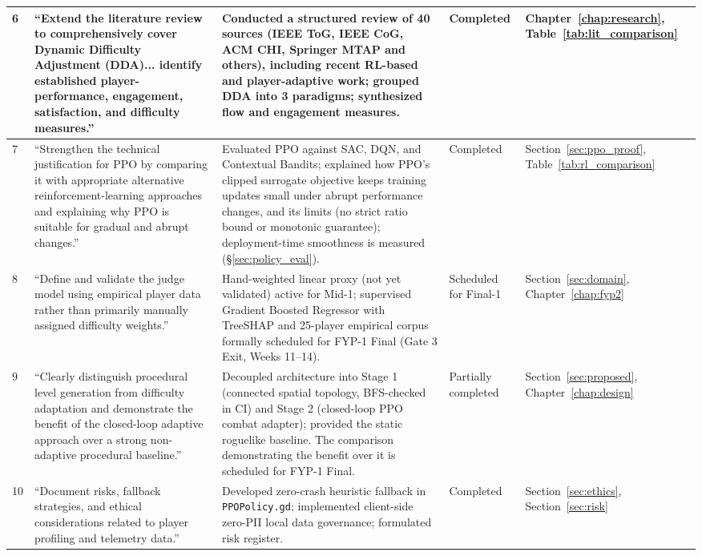 \begin{longtable}{p{}p{}p{}p{}p{}}
\midrule
6 & ``Extend the literature review to comprehensively cover Dynamic Difficulty Adjustment (DDA)... identify established player-performance, engagement, satisfaction, and difficulty measures.'' & Conducted a structured review of 40 sources (IEEE ToG, IEEE CoG, ACM CHI, Springer MTAP and others), including recent RL-based and player-adaptive work; grouped DDA into 3 paradigms; synthesized flow and engagement measures. & Completed & Chapter~\ref{chap:research}, Table~\ref{tab:lit_comparison} \\
\midrule
7 & ``Strengthen the technical justification for PPO by comparing it with appropriate alternative reinforcement-learning approaches and explaining why PPO is suitable for gradual and abrupt changes.'' & Evaluated PPO against SAC, DQN, and Contextual Bandits; explained how PPO's clipped surrogate objective keeps training updates small under abrupt performance changes, and its limits (no strict ratio bound or monotonic guarantee); deployment-time smoothness is measured (§\ref{sec:policy_eval}). & Completed & Section~\ref{sec:ppo_proof}, Table~\ref{tab:rl_comparison} \\
\midrule
8 & ``Define and validate the judge model using empirical player data rather than primarily manually assigned difficulty weights.'' & Hand-weighted linear proxy (not yet validated) active for Mid-1; supervised Gradient Boosted Regressor with TreeSHAP and 25-player empirical corpus formally scheduled for FYP-1 Final (Gate 3 Exit, Weeks 11--14). & Scheduled for Final-1 & Section~\ref{sec:domain}, Chapter~\ref{chap:fyp2} \\
\midrule
9 & ``Clearly distinguish procedural level generation from difficulty adaptation and demonstrate the benefit of the closed-loop adaptive approach over a strong non-adaptive procedural baseline.'' & Decoupled architecture into Stage 1 (connected spatial topology, BFS-checked in CI) and Stage 2 (closed-loop PPO combat adapter); provided the static roguelike baseline. The comparison demonstrating the benefit over it is scheduled for FYP-1 Final. & Partially completed & Section~\ref{sec:proposed}, Chapter~\ref{chap:design} \\
\midrule
10 & ``Document risks, fallback strategies, and ethical considerations related to player profiling and telemetry data.'' & Developed zero-crash heuristic fallback in \texttt{PPOPolicy.gd}; implemented client-side zero-PII local data governance; formulated risk register. & Completed & Section~\ref{sec:ethics}, Section~\ref{sec:risk} \\
\bottomrule
\end{longtable}
